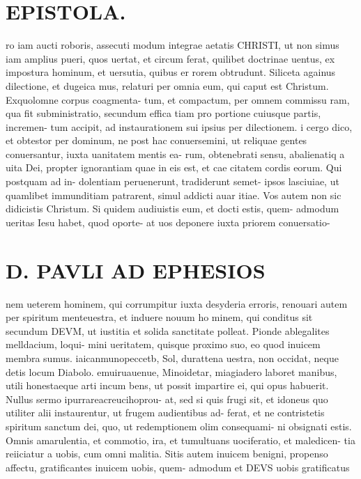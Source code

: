 \documentclass{article}
\begin{document}
\begin{pages}
\section*{EPISTOLA. }
\marginpar{[ p.1 ]}
\marginpar{[ p.r. ]}
\marginpar{[ p.„ ]}
\marginpar{[ p.7.  ]}\pstart ro iam aucti roboris, assecuti modum integrae aetatis CHRISTI, ut non simus iam amplius pueri, quos uertat, et circum ferat, quilibet doctrinae uentus, ex impostura hominum, et uersutia, quibus er rorem obtrudunt.  \pend\pstart Siliceta againus dilectione, et dugeica mus, relaturi per omnia eum, qui caput est Christum. Exquolomne corpus coagmenta- tum, et compactum, per omnem commissu ram, qua fit subministratio, secundum effica tiam pro portione cuiusque partis, incremen- tum accipit, ad instaurationem sui ipsius per dilectionem.  \pend\pstart i cergo dico, et obtestor per dominum, ne post hac conuersemini, ut reliquae gentes conuersantur, iuxta uanitatem mentis ea- rum, obtenebrati sensu, abalienatiq a uita Dei, propter ignorantiam quae in eis est, et cae citatem cordis eorum. Qui postquam ad in- dolentiam peruenerunt, tradiderunt semet- ipsos lasciuiae, ut quamlibet immunditiam patrarent, simul addicti auar itiae.  \pend\pstart Vos autem non sic didicistis Christum. Si quidem audiuistis eum, et docti estis, quem- admodum ueritas Iesu habet, quod oporte- at uos deponere iuxta priorem conuersatio-  \pend
\section*{D. PAVLI AD EPHESIOS }
\marginpar{[ p.8. ]}
\marginpar{[ p.9.  ]}
\marginpar{[ p.10.  ]}
\marginpar{[ p.11.  ]}
\marginpar{[ p.12.  ]}
\marginpar{[ p.13.  ]}\pstart nem ueterem hominem, qui corrumpitur iuxta desyderia erroris, renouari autem per spiritum menteuestra, et induere nouum ho minem, qui conditus sit secundum DEVM, ut iustitia et solida sanctitate polleat.  \pend\pstart Pionde ablegalites melldacium, loqui- mini ueritatem, quisque proximo suo, eo quod inuicem membra sumus.  \pend\pstart iaicanmunopeccetb, Sol, durattena uestra, non occidat, neque detis locum Diabolo.  \pend\pstart emuiruauenue, Minoidetar, miagiadero laboret manibus, utili honestaeque arti incum bens, ut possit impartire ei, qui opus habuerit.  \pend\pstart Nullus sermo ipurrareacreucihoprou- at, sed si quis frugi sit, et idoneus quo utiliter alii instaurentur, ut frugem audientibus ad- ferat, et ne contristetis spiritum sanctum dei, quo, ut redemptionem olim consequami- ni obsignati estis.  \pend\pstart Omnis amarulentia, et commotio,  ira, et tumultuans uociferatio, et maledicen- tia reiiciatur a uobis, cum omni malitia.  \pend\pstart Sitis autem inuicem benigni, propenso affectu, gratificantes inuicem uobis, quem- admodum et DEVS uobis gratificatus  \pend

\end{pages}
\end{document}
